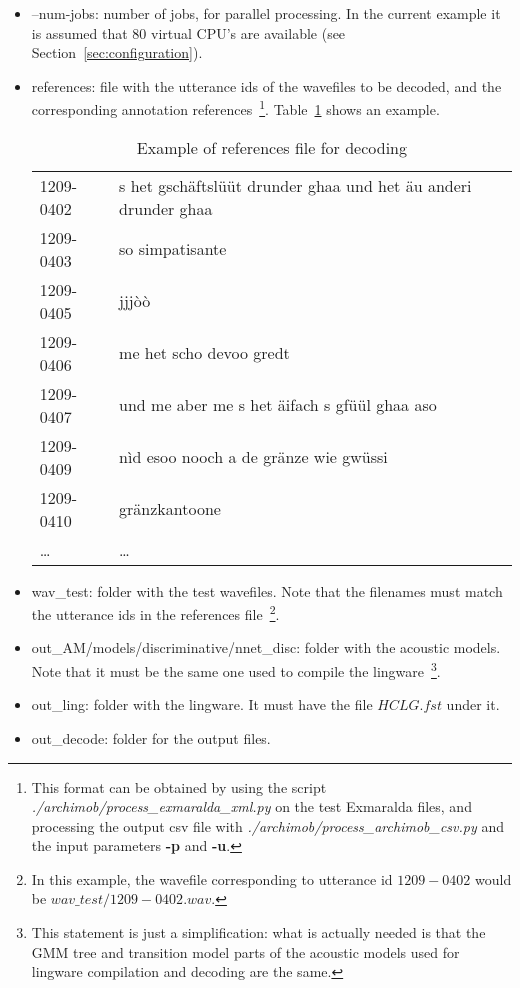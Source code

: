 \documentclass[11pt,a4paper,titlepage,twoside]{article}
\begin{document}
\begin{itemize}
\item --num-jobs: number of jobs, for parallel processing. In the current example it is assumed that 80 virtual CPU's are available (see Section~\ref{sec:configuration}).
\item references: file with the utterance ids of the wavefiles to be decoded, and the corresponding annotation references~\footnote{This format can be obtained by using the script \textit{./archimob/process\_exmaralda\_xml.py} on the test Exmaralda files, and processing the output csv file with \textit{./archimob/process\_archimob\_csv.py} and the input parameters \textbf{-p} and \textbf{-u}.}. Table~\ref{tab:references-example} shows an example.
  \begin{table}[htb!]
    \scriptsize
    \centering
    \begin{tabular}{|l l|}
      \hline
      1209-0402	& s het gschäftslüüt drunder ghaa und het äu anderi drunder ghaa \\
      1209-0403	& so simpatisante \\
      1209-0405	& jjjòò  \\
      1209-0406	& me het scho devoo gredt \\
      1209-0407	& und me aber me s het äifach s gfüül ghaa aso \\
      1209-0409	& nìd esoo nooch a de gränze wie gwüssi \\
      1209-0410	& gränzkantoone \\
      \ldots & \ldots \\
      \hline
    \end{tabular}
    \caption{Example of references file for decoding}
    \label{tab:references-example}
  \end{table}

\item wav\_test: folder with the test wavefiles. Note that the filenames must match the utterance ids in the references file~\footnote{In this example, the wavefile corresponding to utterance id $1209-0402$ would be $wav\_test/1209-0402.wav$.}.

\item out\_AM/models/discriminative/nnet\_disc: folder with the acoustic models. Note that it must be the same one used to compile the lingware~\footnote{This statement is just a simplification: what is actually needed is that the GMM tree and transition model parts of the acoustic models used for lingware compilation and decoding are the same.}.

\item out\_ling: folder with the lingware. It must have the file $HCLG.fst$ under it.

\item out\_decode: folder for the output files.

\end{itemize}
\end{document}
